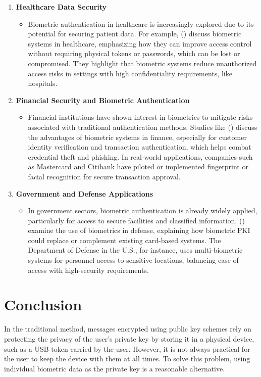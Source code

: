 \documentclass[graybox]{svmult}
\begin{document}
\begin{enumerate}
    \item \textbf{Healthcare Data Security}
          \begin{itemize}
              \item Biometric authentication in healthcare is increasingly explored due to its potential for securing patient data. For example, \citeauthor{Anuar2015} (\citeyear{Anuar2015}) discuss biometric systems in healthcare, emphasizing how they can improve access control without requiring physical tokens or passwords, which can be lost or compromised. They highlight that biometric systems reduce unauthorized access risks in settings with high confidentiality requirements, like hospitals.
          \end{itemize}
    \item \textbf{Financial Security and Biometric Authentication}
          \begin{itemize}
              \item Financial institutions have shown interest in biometrics to mitigate risks associated with traditional authentication methods. Studies like \citeauthor{BhargavSpantzel2007} (\citeyear{BhargavSpantzel2007}) discuss the advantages of biometric systems in finance, especially for customer identity verification and transaction authentication, which helps combat credential theft and phishing. In real-world applications, companies such as Mastercard and Citibank have piloted or implemented fingerprint or facial recognition for secure transaction approval.
          \end{itemize}
    \item \textbf{Government and Defense Applications}
          \begin{itemize}
              \item In government sectors, biometric authentication is already widely applied, particularly for access to secure facilities and classified information. \citeauthor{Bhatnagar2017} (\citeyear{Bhatnagar2017}) examine the use of biometrics in defense, explaining how biometric PKI could replace or complement existing card-based systems. The Department of Defense in the U.S., for instance, uses multi-biometric systems for personnel access to sensitive locations, balancing ease of access with high-security requirements.
          \end{itemize}
\end{enumerate}

\section{Conclusion}
In the traditional method, messages encrypted using public key schemes rely on protecting
the privacy of the user's private key by storing it in a physical device, such as a USB
token carried by the user. However, it is not always practical for the user to keep the
device with them at all times. To solve this problem, using individual biometric data as
the private key is a reasonable alternative.
\end{document}
